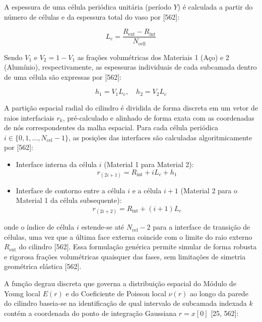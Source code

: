 A espessura de uma célula periódica unitária (período $Y$) é calculada a partir do número de células e da espessura total do vaso por [562]:

\begin{equation}
  L_c = \frac{R_{\text{ext}} - R_{\text{int}}}{N_{\text{cell}}}
  \label{eq:L_c}
\end{equation}

Sendo $V_1$ e $V_2 = 1 - V_1$ as frações volumétricas dos Materiais 1 (Aço) e 2 (Alumínio), respectivamente, as espessuras individuais de cada subcamada dentro de uma célula são expressas por [562]:

\begin{equation}
  h_1 = V_1 L_c , \quad h_2 = V_2 L_c
  \label{eq:h_camadas}
\end{equation}

A partição espacial radial do cilindro é dividida de forma discreta em um vetor de raios interfaciais $r_k$, pré-calculado e alinhado de forma exata com as coordenadas de nós correspondentes da malha espacial. Para cada célula periódica $i \in \{0, 1, \dots, N_{\text{cel}} - 1\}$, as posições das interfaces são calculadas algoritmicamente por [562]:

\begin{itemize}
  \item Interface interna da célula $i$ (Material 1 para Material 2):
  \begin{equation}
    r_{(2i+1)} = R_{\text{int}} + i L_c + h_1
    \label{eq:interface_interna}
  \end{equation}

  \item Interface de contorno entre a célula $i$ e a célula $i+1$ (Material 2 para o Material 1 da célula subsequente):
  \begin{equation}
    r_{(2i+2)} = R_{\text{int}} + (i + 1) L_c
    \label{eq:interface_externa}
  \end{equation}
\end{itemize}

onde o índice de célula $i$ estende-se até $N_{\text{cel}} - 2$ para a interface de transição de células, uma vez que a última face externa coincide com o limite do raio externo $R_{\text{ext}}$ do cilindro [562]. Essa formulação genérica permite simular de forma robusta e rigorosa frações volumétricas quaisquer das fases, sem limitações de simetria geométrica elástica [562].

A função degrau discreta que governa a distribuição espacial do Módulo de Young local $E(r)$ e do Coeficiente de Poisson local $\nu(r)$ ao longo da parede do cilindro baseia-se na identificação de qual intervalo de subcamada indexada $k$ contém a coordenada do ponto de integração Gaussiana $r = x[0]$ [25, 562]:


